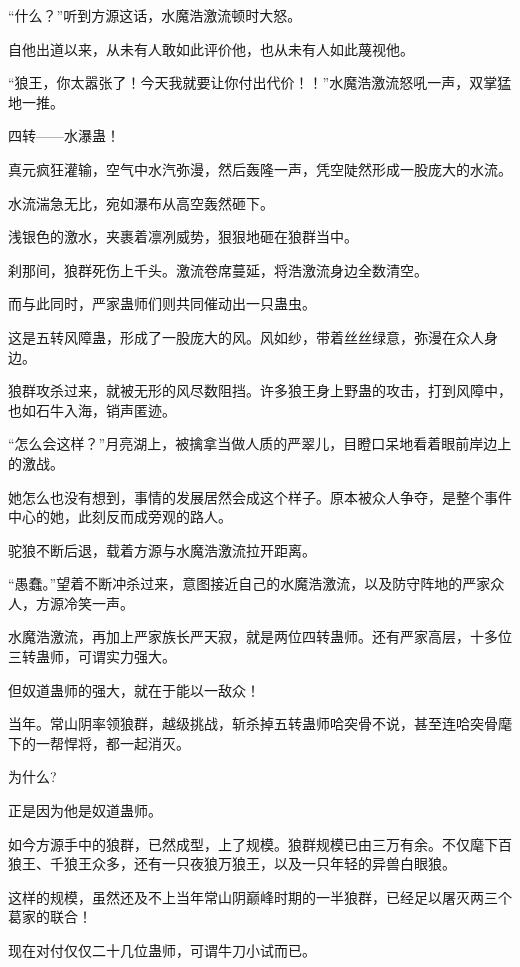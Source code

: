 
\begin{this_body}

“什么？”听到方源这话，水魔浩激流顿时大怒。

自他出道以来，从未有人敢如此评价他，也从未有人如此蔑视他。

“狼王，你太嚣张了！今天我就要让你付出代价！！”水魔浩激流怒吼一声，双掌猛地一推。

四转——水瀑蛊！

真元疯狂灌输，空气中水汽弥漫，然后轰隆一声，凭空陡然形成一股庞大的水流。

水流湍急无比，宛如瀑布从高空轰然砸下。

浅银色的激水，夹裹着凛冽威势，狠狠地砸在狼群当中。

刹那间，狼群死伤上千头。激流卷席蔓延，将浩激流身边全数清空。

而与此同时，严家蛊师们则共同催动出一只蛊虫。

这是五转风障蛊，形成了一股庞大的风。风如纱，带着丝丝绿意，弥漫在众人身边。

狼群攻杀过来，就被无形的风尽数阻挡。许多狼王身上野蛊的攻击，打到风障中，也如石牛入海，销声匿迹。

“怎么会这样？”月亮湖上，被擒拿当做人质的严翠儿，目瞪口呆地看着眼前岸边上的激战。

她怎么也没有想到，事情的发展居然会成这个样子。原本被众人争夺，是整个事件中心的她，此刻反而成旁观的路人。

驼狼不断后退，载着方源与水魔浩激流拉开距离。

“愚蠢。”望着不断冲杀过来，意图接近自己的水魔浩激流，以及防守阵地的严家众人，方源冷笑一声。

水魔浩激流，再加上严家族长严天寂，就是两位四转蛊师。还有严家高层，十多位三转蛊师，可谓实力强大。

但奴道蛊师的强大，就在于能以一敌众！

当年。常山阴率领狼群，越级挑战，斩杀掉五转蛊师哈突骨不说，甚至连哈突骨麾下的一帮悍将，都一起消灭。

为什么?

正是因为他是奴道蛊师。

如今方源手中的狼群，已然成型，上了规模。狼群规模已由三万有余。不仅麾下百狼王、千狼王众多，还有一只夜狼万狼王，以及一只年轻的异兽白眼狼。

这样的规模，虽然还及不上当年常山阴巅峰时期的一半狼群，已经足以屠灭两三个葛家的联合！

现在对付仅仅二十几位蛊师，可谓牛刀小试而已。


\end{this_body}
